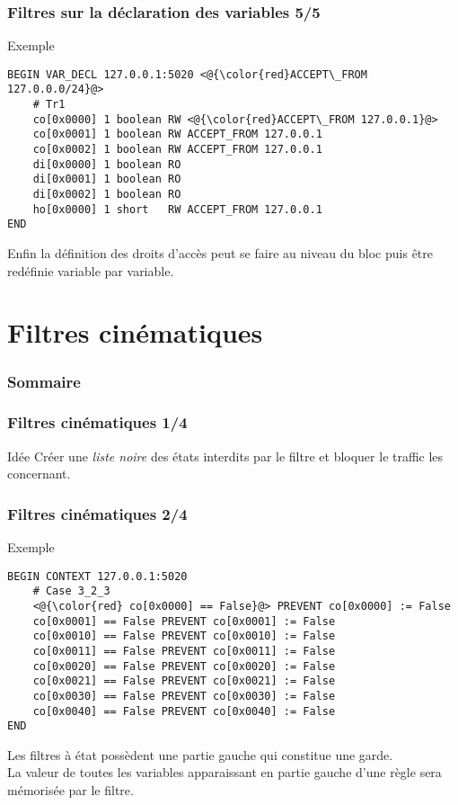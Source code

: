 \documentclass{beamer}
\begin{document}
\begin{frame}[fragile]
    \frametitle{Filtres sur la déclaration des variables 5/5}

    \begin{exampleblock}{Exemple}
        \begin{lstlisting}
BEGIN VAR_DECL 127.0.0.1:5020 <@{\color{red}ACCEPT\_FROM 127.0.0.0/24}@>
    # Tr1
    co[0x0000] 1 boolean RW <@{\color{red}ACCEPT\_FROM 127.0.0.1}@>
    co[0x0001] 1 boolean RW ACCEPT_FROM 127.0.0.1
    co[0x0002] 1 boolean RW ACCEPT_FROM 127.0.0.1
    di[0x0000] 1 boolean RO
    di[0x0001] 1 boolean RO
    di[0x0002] 1 boolean RO
    ho[0x0000] 1 short   RW ACCEPT_FROM 127.0.0.1
END
        \end{lstlisting}
    \end{exampleblock}
    \vfill
    Enfin la définition des droits d'accès peut se faire au niveau du bloc puis être redéfinie variable par variable.
\end{frame}

\section{Filtres cinématiques}

\begin{frame}
    \frametitle{Sommaire}

    \tableofcontents[currentsection]
\end{frame}

\begin{frame}
    \frametitle{Filtres cinématiques 1/4}

    \begin{block}{Idée}
        Créer une {\em liste noire} des états interdits par le filtre et bloquer le traffic les concernant.
    \end{block}
\end{frame}

\begin{frame}[fragile]
    \frametitle{Filtres cinématiques 2/4}

    \begin{exampleblock}{Exemple}
        \begin{lstlisting}
BEGIN CONTEXT 127.0.0.1:5020
    # Case 3_2_3
    <@{\color{red} co[0x0000] == False}@> PREVENT co[0x0000] := False
    co[0x0001] == False PREVENT co[0x0001] := False
    co[0x0010] == False PREVENT co[0x0010] := False
    co[0x0011] == False PREVENT co[0x0011] := False
    co[0x0020] == False PREVENT co[0x0020] := False
    co[0x0021] == False PREVENT co[0x0021] := False
    co[0x0030] == False PREVENT co[0x0030] := False
    co[0x0040] == False PREVENT co[0x0040] := False
END
        \end{lstlisting}
    \end{exampleblock}
    \vfill
    Les filtres à état possèdent une partie gauche qui constitue une garde.\\
    La valeur de toutes les variables apparaissant en partie gauche d'une règle sera mémorisée par le filtre.
\end{frame}
\end{document}
